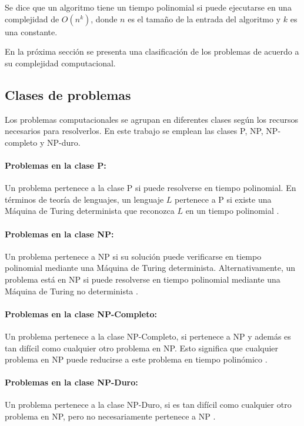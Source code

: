 Se dice que un algoritmo tiene un tiempo polinomial si puede ejecutarse en una complejidad de $O(n^k)$, donde $n$ es el tamaño de la entrada del algoritmo y $k$
es una constante. 

En la próxima sección se presenta una clasificación de los problemas de acuerdo a su complejidad computacional.
\subsection{Clases de problemas}

Los problemas computacionales \cite{authomataTheory} se agrupan en diferentes clases según los recursos 
necesarios para resolverlos. En este trabajo se emplean las clases P, NP, NP-completo y NP-duro.

\paragraph{Problemas en la clase P:} Un problema pertenece a la clase P si puede resolverse en tiempo polinomial. En términos de teoría de lenguajes, un lenguaje
$L$ pertenece a P si existe una Máquina de Turing determinista que reconozca $L$ en un tiempo polinomial \cite{authomataTheory}.

\paragraph{Problemas en la clase NP:}
Un problema pertenece a NP si su solución puede verificarse en tiempo polinomial mediante una Máquina de Turing determinista. Alternativamente, un problema está en NP si puede resolverse en tiempo polinomial mediante una Máquina de Turing no determinista \cite{authomataTheory}.

\paragraph{Problemas en la clase NP-Completo:}
Un problema pertenece a la clase NP-Completo, si pertenece a NP y además es tan difícil como cualquier otro problema en NP. Esto significa que cualquier problema en NP puede reducirse a este problema en tiempo polinómico \cite{authomataTheory}.

\paragraph{Problemas en la clase NP-Duro:}
Un problema pertenece a la clase NP-Duro, si es tan difícil como cualquier otro problema en NP, pero no necesariamente pertenece a NP \cite{authomataTheory}. 

